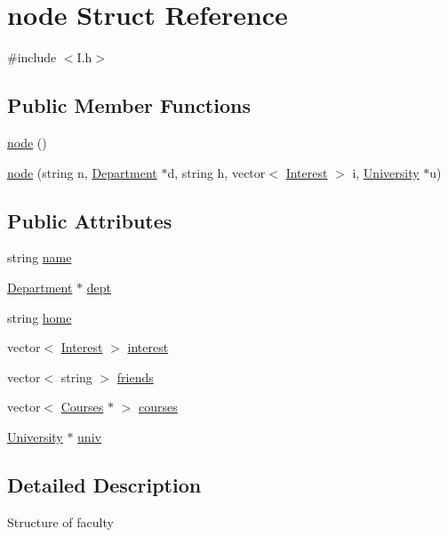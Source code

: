 \hypertarget{structnode}{\section{node \-Struct \-Reference}
\label{structnode}
}


{\ttfamily \#include $<$\-I.\-h$>$}

\subsection*{\-Public \-Member \-Functions}
\begin{DoxyCompactItemize}
\item 
\hyperlink{structnode_a82669b7358b50bd8d7888d7df4ff8dfa}{node} ()
\item 
\hyperlink{structnode_a65a605b13afddc1b178220800fad9744}{node} (string n, \hyperlink{structDepartment}{\-Department} $\ast$d, string h, vector$<$ \hyperlink{structInterest}{\-Interest} $>$ i, \hyperlink{classUniversity}{\-University} $\ast$u)
\end{DoxyCompactItemize}
\subsection*{\-Public \-Attributes}
\begin{DoxyCompactItemize}
\item 
string \hyperlink{structnode_a6f37507fe51c05131068da71ef739323}{name}
\item 
\hyperlink{structDepartment}{\-Department} $\ast$ \hyperlink{structnode_afbdcc9dd588b59ab4ef3ec205a5c2df7}{dept}
\item 
string \hyperlink{structnode_aafaced5cb76f544f5c0f5d3a80785be6}{home}
\item 
vector$<$ \hyperlink{structInterest}{\-Interest} $>$ \hyperlink{structnode_a6950c053c075ceb7a8651203fd2ec446}{interest}
\item 
vector$<$ string $>$ \hyperlink{structnode_ab4fb10bac8cd7b31ec6e9b93ca1f6240}{friends}
\item 
vector$<$ \hyperlink{structCourses}{\-Courses} $\ast$ $>$ \hyperlink{structnode_ae44f257604eda7c64a244f8f0d75284f}{courses}
\item 
\hyperlink{classUniversity}{\-University} $\ast$ \hyperlink{structnode_a934ae7f8d66298e22149135593227f41}{univ}
\end{DoxyCompactItemize}


\subsection{\-Detailed \-Description}
\-Structure of faculty 

